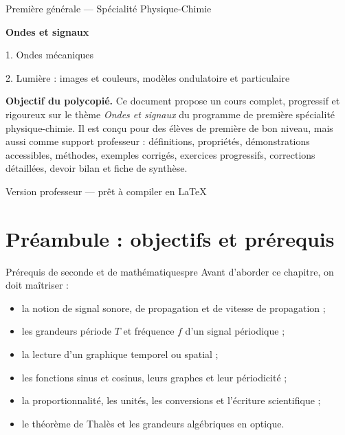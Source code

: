 \documentclass[11pt,a4paper]{article}
\newcounter{exercice}
\newcounter{correction}
\begin{document}
\begin{titlepage}
\centering
\vspace*{1cm}
{\Large Première générale — Spécialité Physique-Chimie\par}
\vspace{1cm}
{\Huge\bfseries Ondes et signaux\par}
\vspace{0.4cm}
{\LARGE 1. Ondes mécaniques\par}
{\LARGE 2. Lumière : images et couleurs, modèles ondulatoire et particulaire\par}
\vspace{1cm}
\begin{tcolorbox}[colframe=bleuprepa,colback=blue!3!white,width=0.92\textwidth]
\textbf{Objectif du polycopié.} Ce document propose un cours complet, progressif et rigoureux sur le thème \emph{Ondes et signaux} du programme de première spécialité physique-chimie. Il est conçu pour des élèves de première de bon niveau, mais aussi comme support professeur : définitions, propriétés, démonstrations accessibles, méthodes, exemples corrigés, exercices progressifs, corrections détaillées, devoir bilan et fiche de synthèse.
\end{tcolorbox}
\vfill
{\large Version professeur — prêt à compiler en \LaTeX\par}
\end{titlepage}

\tableofcontents
\newpage

\section*{Préambule : objectifs et prérequis}

\begin{retenirbox}{Prérequis de seconde et de mathématiques}{pre}
Avant d'aborder ce chapitre, on doit maîtriser :
\begin{itemize}[label=$\triangleright$]
  \item la notion de signal sonore, de propagation et de vitesse de propagation ;
  \item les grandeurs période $T$ et fréquence $f$ d'un signal périodique ;
  \item la lecture d'un graphique temporel ou spatial ;
  \item les fonctions sinus et cosinus, leurs graphes et leur périodicité ;
  \item la proportionnalité, les unités, les conversions et l'écriture scientifique ;
  \item le théorème de Thalès et les grandeurs algébriques en optique.
\end{itemize}
\end{retenirbox}
\end{document}
